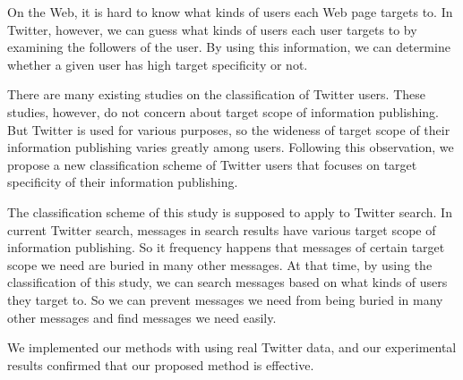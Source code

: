 \begin{eabstract}
On the Web, it is hard to know what kinds of users each Web page
 targets to.  In Twitter, however, we can guess what kinds of users
 each user targets to by examining the followers of the user.  By using
 this information, we can determine whether a given user has high
 target specificity or not.

There are many existing studies on the classification of Twitter
 users. These studies, however, do not concern about target scope of
 information publishing.  But Twitter is used for various purposes, so
 the wideness of target scope of their information publishing varies
 greatly among users.  Following this observation, we propose a new
 classification scheme of Twitter users that focuses on target
 specificity of their information publishing.

The classification scheme of this study is supposed to apply to Twitter
 search.  In current Twitter search, messages in search results have
 various target scope of information publishing.  So it frequency
 happens that messages of certain target scope we need are buried in
 many other messages.  At that time, by using the classification of this
 study, we can search messages based on what kinds of users they target
 to.  So we can prevent messages we need from being buried in many other
 messages and find messages we need easily.

We implemented our methods with using real Twitter data, and our
 experimental results confirmed that our proposed method is effective.

\end{eabstract}

